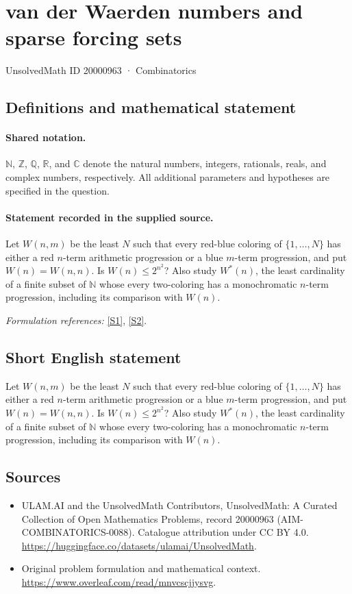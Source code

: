 \documentclass[11pt]{article}
\newcommand{\sref}[2]{\hyperlink{source:#1:#2}{[S#2]}}
\begin{document}
\setcounter{section}{20000962}
\section{van der Waerden numbers and sparse forcing sets}\label{20000963}
{\small UnsolvedMath ID 20000963 · Combinatorics}
\subsection{Definitions and mathematical statement}

\paragraph{Shared notation.}$\mathbb N$, $\mathbb Z$, $\mathbb Q$, $\mathbb R$, and $\mathbb C$ denote the natural numbers, integers, rationals, reals, and complex numbers, respectively. All additional parameters and hypotheses are specified in the question.


\paragraph{Statement recorded in the supplied source.}
Let $W(n,m)$ be the least $N$ such that every red-blue coloring of $\{1,\ldots,N\}$ has either a red $n$-term arithmetic progression or a blue $m$-term progression, and put $W(n)=W(n,n)$. Is $W(n)\leq2^{n^2}$? Also study $W^*(n)$, the least cardinality of a finite subset of $\mathbb N$ whose every two-coloring has a monochromatic $n$-term progression, including its comparison with $W(n)$.
\par\smallskip\textit{Formulation references:} \sref{20000963}{1}, \sref{20000963}{2}.
\subsection{Short English statement}
Let $W(n,m)$ be the least $N$ such that every red-blue coloring of $\{1,\ldots,N\}$ has either a red $n$-term arithmetic progression or a blue $m$-term progression, and put $W(n)=W(n,n)$. Is $W(n)\leq2^{n^2}$? Also study $W^*(n)$, the least cardinality of a finite subset of $\mathbb N$ whose every two-coloring has a monochromatic $n$-term progression, including its comparison with $W(n)$.
\subsection{Sources}
\begin{itemize}
\item[\hypertarget{source:20000963:1}{S1}] ULAM.AI and the UnsolvedMath Contributors, UnsolvedMath: A Curated Collection of Open Mathematics Problems, record 20000963 (AIM-COMBINATORICS-0088). Catalogue attribution under CC BY 4.0.
\url{https://huggingface.co/datasets/ulamai/UnsolvedMath}.
\item[\hypertarget{source:20000963:2}{S2}] Original problem formulation and mathematical context.
\url{https://www.overleaf.com/read/mnvcscjjysvg}.
\end{itemize}
\label{end:20000963}
\end{document}
